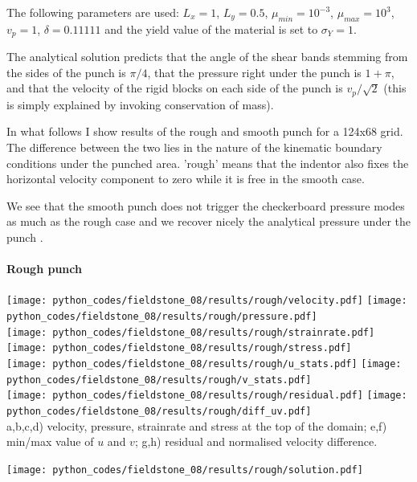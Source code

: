 The following parameters are used: $L_x=1$, $L_y=0.5$, $\mu_{min}=10^{-3}$, 
$\mu_{max}=10^3$, $v_p=1$, $\delta=0.11111$ 
and the yield value of the material is set to $\sigma_Y=1$. 

The analytical solution predicts that the angle of the shear bands stemming from the sides of the punch 
is $\pi/4$, that the pressure right under the punch is $1+\pi$, 
and that the velocity of the rigid blocks on each side of the punch is $v_p/\sqrt{2}$ 
(this is simply explained by invoking conservation of mass).

In what follows I show results of the rough and smooth punch for a 124x68 grid. The difference between the two
lies in the nature of the kinematic boundary conditions under the punched area. 'rough' means that the indentor 
also fixes the horizontal velocity component to zero while it is free in the smooth case.

We see that the smooth punch does not trigger the checkerboard pressure modes as much as the rough case 
and we recover nicely the analytical pressure under the punch \cite{thfb08,gltf18}.

\newpage
\paragraph{Rough punch} 

\begin{center}
\texttt{[image: python\_codes/fieldstone\_08/results/rough/velocity.pdf]}
\texttt{[image: python\_codes/fieldstone\_08/results/rough/pressure.pdf]}\\
\texttt{[image: python\_codes/fieldstone\_08/results/rough/strainrate.pdf]}
\texttt{[image: python\_codes/fieldstone\_08/results/rough/stress.pdf]}\\
\texttt{[image: python\_codes/fieldstone\_08/results/rough/u\_stats.pdf]}
\texttt{[image: python\_codes/fieldstone\_08/results/rough/v\_stats.pdf]}\\
\texttt{[image: python\_codes/fieldstone\_08/results/rough/residual.pdf]}
\texttt{[image: python\_codes/fieldstone\_08/results/rough/diff\_uv.pdf]}\\
{\captionfont a,b,c,d) velocity, pressure, strainrate and stress at the top of the domain; 
e,f) min/max value of $u$ and $v$;
g,h) residual and normalised velocity difference.}
\end{center}

\newpage
\texttt{[image: python\_codes/fieldstone\_08/results/rough/solution.pdf]}



